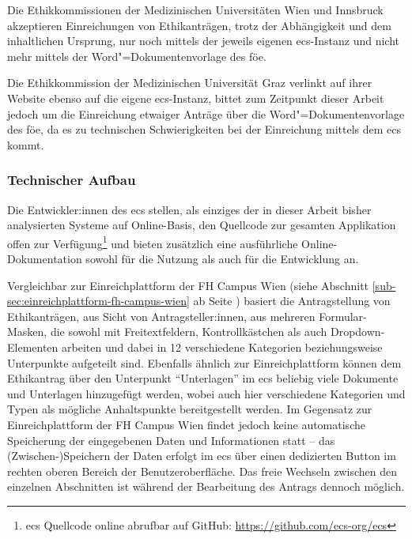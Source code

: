 \documentclass[a4paper,12pt,twoside,numbers=noendperiod]{scrreprt}
\begin{document}
Die Ethikkommissionen der Medizinischen Universitäten Wien und Innsbruck akzeptieren Einreichungen von Ethikanträgen, trotz der Abhängigkeit und dem inhaltlichen Ursprung, nur noch mittels der jeweils eigenen \ac{ecs}-Instanz und nicht mehr mittels der Word"=Dokumentenvorlage des \ac{föe}. \cite{ethikkommission_der_medizinischen_universitat_wien_ethik_2023, medizinische_universitat_innsbruck_einreichungen_2023}

Die Ethikkommission der Medizinischen Universität Graz verlinkt auf ihrer Website ebenso auf die eigene \ac{ecs}-Instanz, bittet zum Zeitpunkt dieser Arbeit jedoch um die Einreichung etwaiger Anträge über die Word"=Dokumentenvorlage des \ac{föe}, da es zu technischen Schwierigkeiten bei der Einreichung mittels dem \ac{ecs} kommt. \cite{medizinische_universitat_graz_ethikkommission_2023}

\subsubsection*{Technischer Aufbau}
\label{sub-sub-sec:ecs-technischer-aufbau}

Die Entwickler:innen des \acl{ecs} stellen, als einziges der in dieser Arbeit bisher analysierten Systeme auf Online-Basis, den Quellcode zur gesamten Applikation offen zur Verfügung\footnote{\ac{ecs} Quellcode online abrufbar auf GitHub: \url{https://github.com/ecs-org/ecs}} und bieten zusätzlich eine ausführliche Online-Dokumentation sowohl für die Nutzung als auch für die Entwicklung an. \cite{medizinische_universitat_wien_ecs-docs_about-2021, medizinische_universitat_wien_development_2021, medizinische_universitat_wien_installationusage_2021}

\medskip

Vergleichbar zur Einreichplattform der FH Campus Wien (siehe Abschnitt \ref{sub-sec:einreichplattform-fh-campus-wien} ab Seite \pageref{sub-sec:einreichplattform-fh-campus-wien}) basiert die Antragstellung von Ethikanträgen, aus Sicht von Antragsteller:innen, aus mehreren Formular-Masken, die sowohl mit Freitextfeldern, Kontrollkästchen als auch Dropdown-Elementen arbeiten und dabei in 12 verschiedene Kategorien beziehungsweise Unterpunkte aufgeteilt sind. Ebenfalls ähnlich zur Einreichplattform können dem Ethikantrag über den Unterpunkt \enquote{Unterlagen} im \ac{ecs} beliebig viele Dokumente und Unterlagen hinzugefügt werden, wobei auch hier verschiedene Kategorien und Typen als mögliche Anhaltspunkte bereitgestellt werden. Im Gegensatz zur Einreichplattform der FH Campus Wien findet jedoch keine automatische Speicherung der eingegebenen Daten und Informationen statt -- das (Zwischen-)Speichern der Daten erfolgt im \ac{ecs} über einen dedizierten Button im rechten oberen Bereich der Benutzeroberfläche. Das freie Wechseln zwischen den einzelnen Abschnitten ist während der Bearbeitung des Antrags dennoch möglich.
\end{document}
